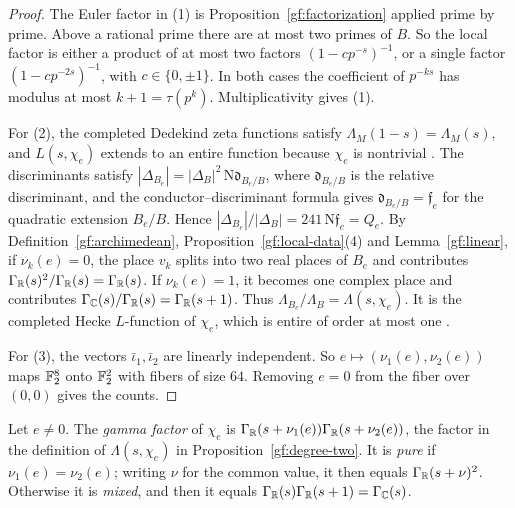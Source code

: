 \begin{proof}
The Euler factor in (1) is Proposition~\ref{gf:factorization} applied prime
by prime. Above a rational prime there are at most two primes of $B$. So
the local factor is either a product of at most two factors
$(1-cp^{-s})^{-1}$, or a single factor $(1-cp^{-2s})^{-1}$, with
$c\in\{0,\pm1\}$. In both cases the coefficient of $p^{-ks}$ has modulus at
most $k+1=\tau(p^k)$. Multiplicativity gives (1).

For (2), the completed Dedekind zeta functions satisfy
$\Lambda_M(1-s)=\Lambda_M(s)$, and $L(s,\chi_e)$ extends to an entire
function because $\chi_e$ is nontrivial \cite{Hecke1920,Tate1967}. The
discriminants satisfy
$|\Delta_{B_e}|=|\Delta_B|^2\,\mathrm N\mathfrak d_{B_e/B}$, where
$\mathfrak d_{B_e/B}$ is the relative discriminant, and the
conductor--discriminant formula gives $\mathfrak d_{B_e/B}=\mathfrak f_e$
for the quadratic extension $B_e/B$. Hence
$|\Delta_{B_e}|/|\Delta_B|=241\,\mathrm N\mathfrak f_e=Q_e$. By
Definition~\ref{gf:archimedean}, Proposition~\ref{gf:local-data}(4) and
Lemma~\ref{gf:linear}, if
$\nu_k(e)=0$, the place $v_k$ splits into two real places of $B_e$ and contributes
$\Gamma_\mathbb R(s)^2/\Gamma_\mathbb R(s)=\Gamma_\mathbb R(s)$. If $\nu_k(e)=1$, it becomes one
complex place and contributes $\Gamma_\mathbb C(s)/\Gamma_\mathbb R(s)=\Gamma_\mathbb R(s+1)$.
Thus $\Lambda_{B_e}/\Lambda_B=\Lambda(s,\chi_e)$. It is the completed Hecke
$L$-function of $\chi_e$, which is entire of order at most one
\cite{Hecke1920,Tate1967}.

For (3), the vectors $\bar\iota_1,\bar\iota_2$ are linearly independent. So
$e\mapsto(\nu_1(e),\nu_2(e))$ maps $\mathbb F_2^8$ onto $\mathbb F_2^2$ with fibers of
size $64$. Removing $e=0$ from the fiber over $(0,0)$ gives the counts.
\end{proof}

\begin{definition}\label{gf:pure-mixed}
Let $e\ne0$. The \emph{gamma factor} of $\chi_e$ is
$\Gamma_\mathbb R(s+\nu_1(e))\Gamma_\mathbb R(s+\nu_2(e))$, the factor in the definition of
$\Lambda(s,\chi_e)$ in Proposition~\ref{gf:degree-two}. It is \emph{pure} if
$\nu_1(e)=\nu_2(e)$; writing $\nu$ for the common value, it then equals
$\Gamma_\mathbb R(s+\nu)^2$. Otherwise it is \emph{mixed}, and then it equals
$\Gamma_\mathbb R(s)\Gamma_\mathbb R(s+1)=\Gamma_\mathbb C(s)$.
\end{definition}

